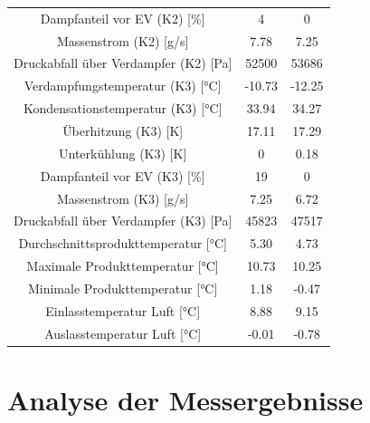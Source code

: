 \begin{table}[h!]
\begin{tabular}{|ccc|}
\multicolumn{1}{|c|}{Dampfanteil vor EV (K2) {[}\%{]}}          & \multicolumn{1}{c|}{4}      & 0             \\
\multicolumn{1}{|c|}{Massenstrom (K2) {[}g/s{]}}                & \multicolumn{1}{c|}{7.78}   & 7.25          \\
\multicolumn{1}{|c|}{Druckabfall über Verdampfer (K2) {[}Pa{]}} & \multicolumn{1}{c|}{52500}  & 53686         \\ \hline
\multicolumn{1}{|c|}{Verdampfungstemperatur (K3) {[}°C{]}}      & \multicolumn{1}{c|}{-10.73} & -12.25        \\
\multicolumn{1}{|c|}{Kondensationstemperatur (K3) {[}°C{]}}    & \multicolumn{1}{c|}{33.94}  & 34.27         \\
\multicolumn{1}{|c|}{Überhitzung (K3) {[}K{]}}                  & \multicolumn{1}{c|}{17.11}  & 17.29         \\
\multicolumn{1}{|c|}{Unterkühlung (K3) {[}K{]}}                 & \multicolumn{1}{c|}{0}      & 0.18          \\
\multicolumn{1}{|c|}{Dampfanteil vor EV (K3) {[}\%{]}}          & \multicolumn{1}{c|}{19}     & 0             \\
\multicolumn{1}{|c|}{Massenstrom (K3) {[}g/s{]}}                & \multicolumn{1}{c|}{7.25}   & 6.72          \\
\multicolumn{1}{|c|}{Druckabfall über Verdampfer (K3) {[}Pa{]}} & \multicolumn{1}{c|}{45823}  & 47517         \\ \hline
\multicolumn{1}{|c|}{Durchschnittsprodukttemperatur {[}°C{]}}   & \multicolumn{1}{c|}{5.30}   & 4.73          \\
\multicolumn{1}{|c|}{Maximale Produkttemperatur {[}°C{]}}       & \multicolumn{1}{c|}{10.73}  & 10.25         \\
\multicolumn{1}{|c|}{Minimale Produkttemperatur {[}°C{]}}       & \multicolumn{1}{c|}{1.18}   & -0.47         \\
\multicolumn{1}{|c|}{Einlasstemperatur Luft {[}°C{]}}           & \multicolumn{1}{c|}{8.88}   & 9.15          \\
\multicolumn{1}{|c|}{Auslasstemperatur Luft {[}°C{]}}           & \multicolumn{1}{c|}{-0.01}  & -0.78         \\ \hline
\end{tabular}
\end{table}








\chapter{Analyse der Messergebnisse}
\label{cha:Analyse der Messergebnisse}

